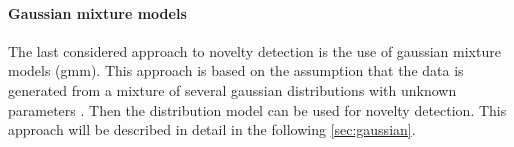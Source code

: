 \paragraph[]{Gaussian mixture models}
The last considered approach to novelty detection is the use of gaussian mixture models (\gls{gmm}). This approach is based on the assumption that the data is generated from a mixture of several gaussian distributions with unknown parameters . Then the distribution model can be used for novelty detection. This approach will be described in detail in the following \autoref{sec:gaussian}.





